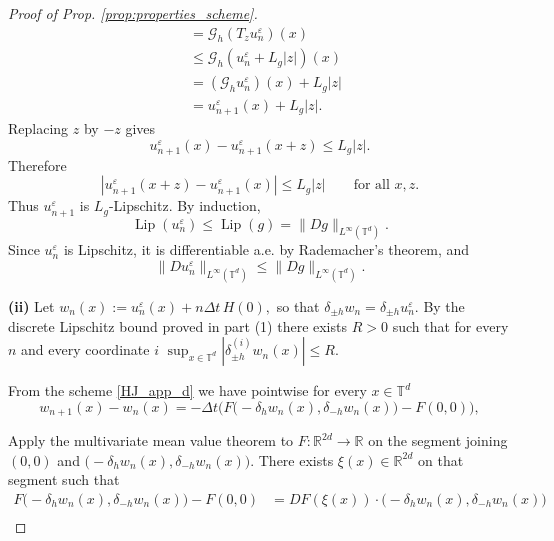 \documentclass[11pt]{amsart}
\theoremstyle{remark}
\theoremstyle{definition}
\theoremstyle{Claim}
\newcommand{\T}{{\mathbb{T}}}
\newcommand{\R}{\mathbb{R}}
\theoremstyle{plain}
\begin{document}
\begin{proof}[Proof of Prop. \ref{prop:properties_scheme}]
\[\begin{aligned}
&=\mathcal G_h(T_z u_n^\varepsilon)(x) \\
&\le \mathcal G_h(u_n^\varepsilon+L_g|z|)(x) \\
&=(\mathcal G_h u_n^\varepsilon)(x)+L_g|z| \\
&=u_{n+1}^\varepsilon(x)+L_g|z| .
\end{aligned}
\]
Replacing \(z\) by \(-z\) gives
\[
u_{n+1}^\varepsilon(x)-u_{n+1}^\varepsilon(x+z)\le L_g|z| .
\]
Therefore
\[
|u_{n+1}^\varepsilon(x+z)-u_{n+1}^\varepsilon(x)|
\le L_g|z|
\qquad\text{for all }x,z .
\]
Thus \(u_{n+1}^\varepsilon\) is \(L_g\)-Lipschitz. By induction,
\[
\operatorname{Lip}(u_n^\varepsilon)\le \operatorname{Lip}(g)
=\|Dg\|_{L^\infty(\T^d)} .
\]
Since \(u_n^\varepsilon\) is Lipschitz, it is differentiable a.e. by Rademacher's theorem, and
\[
\|D u_n^\varepsilon\|_{L^\infty(\T^d)}
\le \|Dg\|_{L^\infty(\T^d)} .
\]

		\noindent\textbf{(ii)}
Let
\(
w_n(x):=u_n^\varepsilon(x)+n\Delta t\,H(0),
\)
so that \(\delta_{\pm h}w_n=\delta_{\pm h}u_n^\varepsilon\). By the discrete Lipschitz bound proved in part (1) there exists \(R>0\) such that for every \(n\) and every coordinate \(i\)
\(
\sup_{x\in\T^d}|\delta^{(i)}_{\pm h} w_n(x)| \le R.
\)

From the scheme \eqref{HJ_app_d} we have pointwise for every \(x\in\T^d\)
\[
w_{n+1}(x)-w_n(x)
= -\Delta t\Big(F\big(-\delta_h w_n(x),\delta_{-h} w_n(x)\big)-F(0,0)\Big),
\]

Apply the multivariate mean value theorem to \(F:\R^{2d}\to\R\) on the segment joining \((0,0)\) and \(\big(-\delta_h w_n(x),\delta_{-h} w_n(x)\big)\). There exists \(\xi(x)\in\R^{2d}\) on that segment such that
\[
\begin{aligned}
F\big(-\delta_h w_n(x),\delta_{-h} w_n(x)\big)-F(0,0)
&= DF(\xi(x))\cdot\big(-\delta_h w_n(x),\delta_{-h} w_n(x)\big)\\
\end{aligned}
\]


\end{proof}
\end{document}
